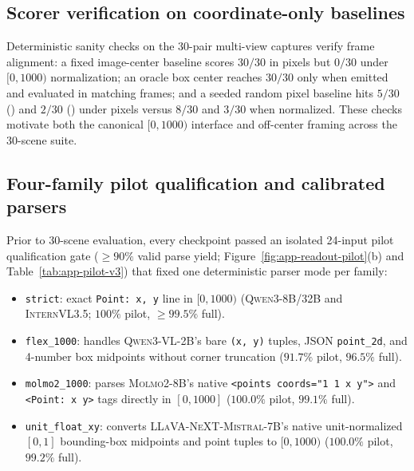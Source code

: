 \subsection{Scorer verification on coordinate-only baselines}
Deterministic sanity checks on the 30-pair multi-view captures verify frame alignment: a fixed image-center baseline scores $30/30$ in pixels but $0/30$ under $[0, 1000)$ normalization; an oracle box center reaches $30/30$ only when emitted and evaluated in matching frames; and a seeded random pixel baseline hits $5/30$ (\original) and $2/30$ (\converted) under pixels versus $8/30$ and $3/30$ when normalized. These checks motivate both the canonical $[0, 1000)$ interface and off-center framing across the 30-scene suite.

\subsection{Four-family pilot qualification and calibrated parsers}
Prior to 30-scene evaluation, every checkpoint passed an isolated 24-input pilot qualification gate ($\ge 90\%$ valid parse yield; Figure~\ref{fig:app-readout-pilot}(b) and Table~\ref{tab:app-pilot-v3}) that fixed one deterministic parser mode per family:
\begin{itemize}
    \item \texttt{strict}: exact \texttt{Point:\ x, y} line in $[0, 1000)$ (\textsc{Qwen3-8B/32B} and \textsc{InternVL3.5}; $100\%$ pilot, $\ge 99.5\%$ full).
    \item \texttt{flex\_1000}: handles \textsc{Qwen3-VL-2B}'s bare \texttt{(x, y)} tuples, JSON \texttt{point\_2d}, and 4-number box midpoints without corner truncation ($91.7\%$ pilot, $96.5\%$ full).
    \item \texttt{molmo2\_1000}: parses \textsc{Molmo2-8B}'s native \texttt{<points coords="1 1 x y">} and \texttt{<Point:\ x y>} tags directly in $[0, 1000]$ ($100.0\%$ pilot, $99.1\%$ full).
    \item \texttt{unit\_float\_xy}: converts \textsc{LLaVA-NeXT-Mistral-7B}'s native unit-normalized $[0, 1]$ bounding-box midpoints and point tuples to $[0, 1000)$ ($100.0\%$ pilot, $99.2\%$ full).
\end{itemize}

